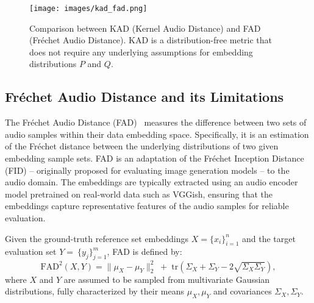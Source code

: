\begin{figure}[t]
    \centering
    \texttt{[image: images/kad\_fad.png]}
    \caption{Comparison between KAD (Kernel Audio Distance) and FAD (Fréchet Audio Distance). KAD is a distribution-free metric that does not require any underlying assumptions for embedding distributions $P$ and $Q$.}
    \label{fig:kad&fad}
\end{figure}


\subsection{Fréchet Audio Distance and its Limitations}
The Fréchet Audio Distance (FAD)~\cite{fad} measures the difference between two sets of audio samples within their data embedding space. Specifically, it is an estimation of the Fréchet distance between the underlying distributions of two given embedding sample sets. FAD is an adaptation of the Fréchet Inception Distance (FID)\cite{fid} -- originally proposed for evaluating image generation models -- to the audio domain. The embeddings are typically extracted using an audio encoder model pretrained on real-world data such as VGGish\cite{vggish}, ensuring that the embeddings capture representative features of the audio samples for reliable evaluation. 

Given the ground-truth reference set embeddings $X = \{x_i\}_{i=1}^n$ and the target evaluation set $Y= ~ \{y_j\}_{j=1}^m$, FAD is defined by:
\begin{equation}
    \text{FAD}^2(X,Y) = \|\mu_X - \mu_Y\|_2^2 \;+\; \text{tr}\left(\Sigma_X + \Sigma_Y - 2\sqrt{\Sigma_X \Sigma_Y}\right),
\label{eq:FAD}
\end{equation}
where $X$ and $Y$ are assumed to be sampled from multivariate Gaussian distributions, fully characterized by their means $\mu_X, \mu_Y$ and covariances $\Sigma_X, \Sigma_Y$.

